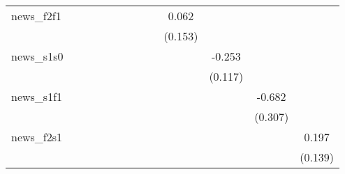 {\begin{tabular}{l*{12}{c}}
\addlinespace
news\_f2f1   &                     &                     &                     &                     &                     &                     &                     &                     &       0.062         &                     &                     &                     \\
            &                     &                     &                     &                     &                     &                     &                     &                     &     (0.153)         &                     &                     &                     \\
\addlinespace
news\_s1s0   &                     &                     &                     &                     &                     &                     &                     &                     &                     &      -0.253\sym{**} &                     &                     \\
            &                     &                     &                     &                     &                     &                     &                     &                     &                     &     (0.117)         &                     &                     \\
\addlinespace
news\_s1f1   &                     &                     &                     &                     &                     &                     &                     &                     &                     &                     &      -0.682\sym{**} &                     \\
            &                     &                     &                     &                     &                     &                     &                     &                     &                     &                     &     (0.307)         &                     \\
\addlinespace
news\_f2s1   &                     &                     &                     &                     &                     &                     &                     &                     &                     &                     &                     &       0.197         \\
            &                     &                     &                     &                     &                     &                     &                     &                     &                     &                     &                     &     (0.139)         \\

\end{tabular}}
